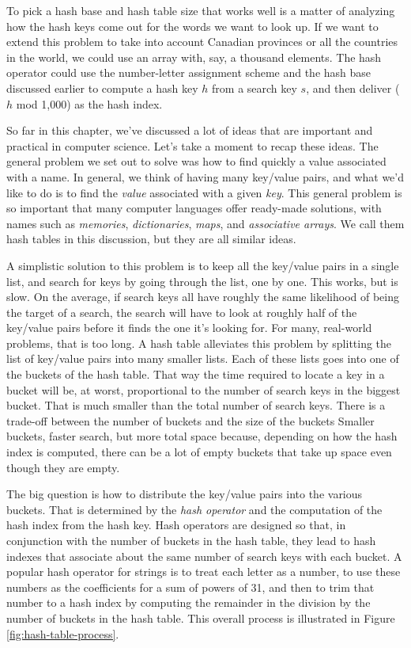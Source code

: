 To pick a hash base and hash table size
that works well is a matter of analyzing how
the hash keys come out for the words we want to look up.
If we want to extend this problem to take into
account Canadian provinces or all the countries in the world, we could
use an array with, say, a thousand elements.
The hash operator could use the number-letter assignment scheme and
the hash base discussed earlier to compute a hash key $h$ from a search key $s$,
and then deliver ($h$ mod 1,000) as the hash index.

So far in this chapter, we've discussed a lot of ideas
that are important and practical in computer science.
Let's take a moment to recap these ideas.
The general problem we set out to solve was how to find quickly a value
associated with a name. In general, we think of having many key/value pairs,
and what we'd like to do is to find the \emph{value} associated with a given
\emph{key}. This general problem is so important that many computer languages
offer ready-made solutions, with names such as \emph{memories}, \emph{dictionaries},
\emph{maps}, and \emph{associative arrays}.
We call them hash tables in this discussion,
but they are all similar ideas.

A simplistic solution to this problem is to keep all the key/value pairs in a
single list, and search for keys by going through the list, one by one.
This works, but is slow.
On the average, if search keys all have roughly the same likelihood of
being the target of a search,
the search will have to look at roughly half
of the key/value pairs before it finds the one it's looking for.
For many, real-world problems, that is too long.
A hash table alleviates this problem
by splitting the list of key/value pairs into many smaller lists.
Each of these lists goes into one of the buckets of the hash table.
That way the time required to locate a key
in a bucket will be, at worst, proportional
to the number of search keys in the biggest bucket.
That is much smaller than the total number of search keys.
There is a trade-off between the number of buckets and the size of the buckets
Smaller buckets, faster search, but more total space because,
depending on how the hash index is computed,
there can be a lot of empty buckets
that take up space even though they are empty.

The big question is how to distribute the key/value pairs into the various buckets.
That is determined by the \emph{hash operator} and
the computation of the hash index
from the hash key. Hash operators are
designed so that, in conjunction with the number of buckets
in the hash table, they lead to hash indexes
that associate about the same number of search keys with each bucket.
A popular hash operator for
strings is to treat each letter as a number, to use these numbers as the
coefficients for a sum of powers of 31, and then to trim that number to
a hash index by computing the remainder in the division by
the number of buckets in the hash table.
This overall process is illustrated in Figure \ref{fig:hash-table-process}.

